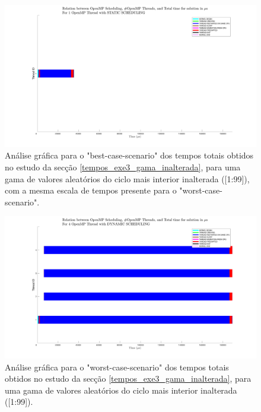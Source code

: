 \documentclass[a4paper]{article}
\begin{document}
\newpage


\begin{figure}[H]
\centering
\includegraphics[width=1\columnwidth]{PNG/best_static_1_thread_scaled.png}
\caption{ Análise gráfica para o "best-case-scenario" dos tempos totais obtidos no estudo da secção \ref{tempos_exe3_gama_inalterada}, para uma gama de valores aleatórios do ciclo mais interior inalterada ([1:99]), com a mesma escala de tempos presente para o "worst-case-scenario". }
\label{fig:best_static_1_thread_scaled}
\end{figure}

\begin{figure}[H]
\centering
\includegraphics[width=1\columnwidth]{PNG/worst_dynamic_4_threads.png}
\caption{ Análise gráfica para o "worst-case-scenario" dos tempos totais obtidos no estudo da secção \ref{tempos_exe3_gama_inalterada}, para uma gama de valores aleatórios do ciclo mais interior inalterada ([1:99]). }
\label{fig:worst_dynamic_4_threads_again}
\end{figure}
\end{document}
